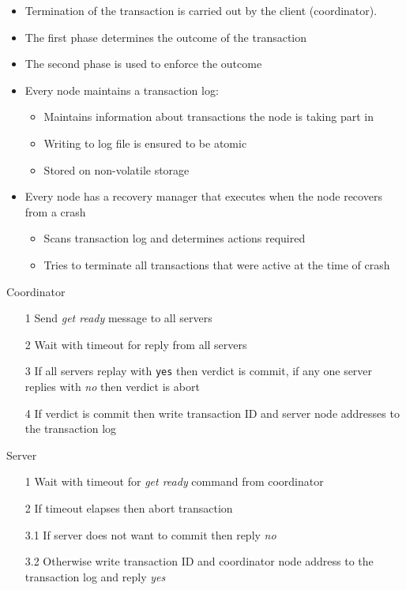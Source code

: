 \documentclass[a4paper]{article}
\begin{document}
\begin{itemize}
  \item Termination of the transaction is carried out by the client
        (coordinator).
  \item The first phase determines the outcome of the transaction
  \item The second phase is used to enforce the outcome
  \item Every node maintains a transaction log:
    \begin{itemize}
      \item Maintains information about transactions the node is taking part in
      \item Writing to log file is ensured to be atomic
      \item Stored on non-volatile storage
    \end{itemize}
  \item Every node has a recovery manager that executes when the node recovers
        from a crash
    \begin{itemize}
      \item Scans transaction log and determines actions required
      \item Tries to terminate all transactions that were active at the time of
            crash
    \end{itemize}
\end{itemize}


\begin{minipage}[t]{0.5\textwidth}
  Coordinator

  \begin{enumerate}
    \item[1] Send \textit{get ready} message to all servers
    \item[2] Wait with timeout for reply from all servers
    \item[3] If all servers replay with \texttt{yes} then verdict is commit, if
             any one server replies with \textit{no} then verdict is abort
    \item[4] If verdict is commit then write transaction ID and server node
             addresses to the transaction log
  \end{enumerate}
\end{minipage}%
\begin{minipage}[t]{0.5\textwidth}
  Server

  \begin{enumerate}
    \item[1]   Wait with timeout for \textit{get ready} command from coordinator
    \item[2]   If timeout elapses then abort transaction
    \item[3.1] If server does not want to commit then reply \textit{no}
    \item[3.2] Otherwise write transaction ID and coordinator node address to
               the transaction log and reply \textit{yes}
  \end{enumerate}
\end{minipage}
\end{document}

